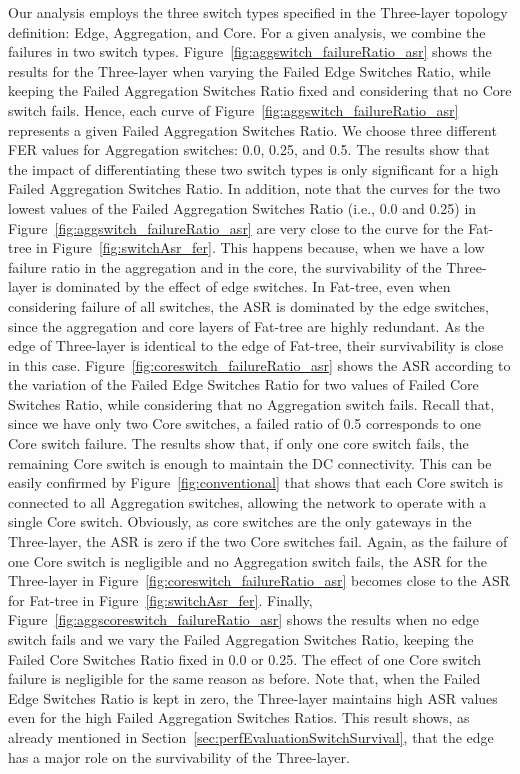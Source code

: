 Our analysis employs the three switch types specified in the Three-layer topology definition: Edge, Aggregation, and Core. For a given analysis, we combine the failures in two switch types. Figure~\ref{fig:aggswitch_failureRatio_asr} shows the results for the Three-layer when varying the Failed Edge Switches Ratio, while keeping the Failed Aggregation Switches Ratio fixed and considering that no Core switch fails. Hence, each curve of Figure~\ref{fig:aggswitch_failureRatio_asr} represents a given Failed Aggregation Switches Ratio. We choose three different FER values for Aggregation switches: 0.0, 0.25, and 0.5. The results show that the impact of differentiating these two switch types is only significant for a high Failed Aggregation Switches Ratio. In addition, note that the curves for the two lowest values of the Failed Aggregation Switches Ratio (i.e., 0.0 and 0.25) in Figure~\ref{fig:aggswitch_failureRatio_asr} are very close to the curve for the Fat-tree in Figure~\ref{fig:switchAsr_fer}. This happens because, when we have a low failure ratio in the aggregation and in the core, the survivability of the Three-layer is dominated by the effect of edge switches. In Fat-tree, even when considering failure of all switches, the ASR is dominated by the edge switches, since the aggregation and core layers of Fat-tree are highly redundant. As the edge of Three-layer is identical to the edge of Fat-tree, their survivability is close in this case. Figure~\ref{fig:coreswitch_failureRatio_asr} shows the ASR according to the variation of the Failed Edge Switches Ratio for two values of Failed Core Switches Ratio, while considering that no Aggregation switch fails. Recall that, since we have only two Core switches, a failed ratio of 0.5 corresponds to one Core switch failure. The results show that, if only one core switch fails, the remaining Core switch is enough to maintain the DC connectivity. This can be easily confirmed by Figure~\ref{fig:conventional} that shows that each Core switch is connected to all Aggregation switches, allowing the network to operate with a single Core switch. Obviously, as core switches are the only gateways in the Three-layer, the ASR is zero if the two Core switches fail. Again, as the failure of one Core switch is negligible and no Aggregation switch fails, the ASR for the Three-layer in Figure~\ref{fig:coreswitch_failureRatio_asr} becomes close to the ASR for Fat-tree in Figure~\ref{fig:switchAsr_fer}. Finally, Figure~\ref{fig:aggscoreswitch_failureRatio_asr} shows the results when no edge switch fails and we vary the Failed Aggregation Switches Ratio, keeping the Failed Core Switches Ratio fixed in 0.0 or 0.25. The effect of one Core switch failure is negligible for the same reason as before. Note that, when the Failed Edge Switches Ratio is kept in zero, the Three-layer maintains high ASR values even for the high Failed Aggregation Switches Ratios. This result shows, as already mentioned in Section~\ref{sec:perfEvaluationSwitchSurvival}, that the edge has a major role on the survivability of the Three-layer.

